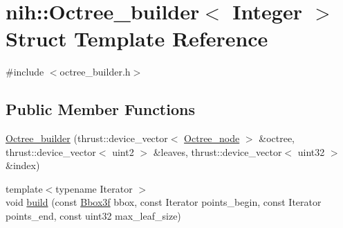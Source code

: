 \hypertarget{structnih_1_1_octree__builder}{
\section{nih\-:\-:\-Octree\-\_\-builder$<$ \-Integer $>$ \-Struct \-Template \-Reference}
\label{structnih_1_1_octree__builder}
}


{\ttfamily \#include $<$octree\-\_\-builder.\-h$>$}

\subsection*{\-Public \-Member \-Functions}
\begin{DoxyCompactItemize}
\item 
\hyperlink{structnih_1_1_octree__builder_a4a7ff86186fca6ebe6122cbf5d85354a}{\-Octree\-\_\-builder} (thrust\-::device\-\_\-vector$<$ \hyperlink{structnih_1_1_octree__node}{\-Octree\-\_\-node} $>$ \&octree, thrust\-::device\-\_\-vector$<$ uint2 $>$ \&leaves, thrust\-::device\-\_\-vector$<$ uint32 $>$ \&index)
\item 
{\footnotesize template$<$typename Iterator $>$ }\\void \hyperlink{structnih_1_1_octree__builder_a54d263ca6cbb13cef60860aa19c2423a}{build} (const \hyperlink{structnih_1_1_bbox}{\-Bbox3f} bbox, const \-Iterator points\-\_\-begin, const \-Iterator points\-\_\-end, const uint32 max\-\_\-leaf\-\_\-size)
\end{DoxyCompactItemize}
